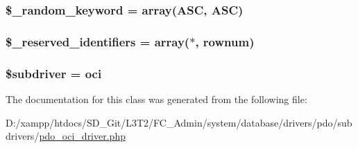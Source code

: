 \subsubsection[{\$\+\_\+random\+\_\+keyword}]{\setlength{\rightskip}{0pt plus 5cm}\$\+\_\+random\+\_\+keyword = array(\textquotesingle{}A\+S\+C\textquotesingle{}, \textquotesingle{}A\+S\+C\textquotesingle{})\hspace{0.3cm}{\ttfamily [protected]}}\label{class_c_i___d_b__pdo__oci__driver_a10213aa6e05f6d924d3277bb1d2fea00}
\hypertarget{class_c_i___d_b__pdo__oci__driver_aa3298c4c62fbee8bb09f1b75b633fb0d}{}
\subsubsection[{\$\+\_\+reserved\+\_\+identifiers}]{\setlength{\rightskip}{0pt plus 5cm}\$\+\_\+reserved\+\_\+identifiers = array(\textquotesingle{}$\ast$\textquotesingle{}, \textquotesingle{}rownum\textquotesingle{})\hspace{0.3cm}{\ttfamily [protected]}}\label{class_c_i___d_b__pdo__oci__driver_aa3298c4c62fbee8bb09f1b75b633fb0d}
\hypertarget{class_c_i___d_b__pdo__oci__driver_a1322ca756348b11d080cb7a4f590de15}{}
\subsubsection[{\$subdriver}]{\setlength{\rightskip}{0pt plus 5cm}\$subdriver = \textquotesingle{}oci\textquotesingle{}}\label{class_c_i___d_b__pdo__oci__driver_a1322ca756348b11d080cb7a4f590de15}


The documentation for this class was generated from the following file\+:\begin{DoxyCompactItemize}
\item 
D\+:/xampp/htdocs/\+S\+D\+\_\+\+Git/\+L3\+T2/\+F\+C\+\_\+\+Admin/system/database/drivers/pdo/subdrivers/\hyperlink{pdo__oci__driver_8php}{pdo\+\_\+oci\+\_\+driver.\+php}\end{DoxyCompactItemize}
